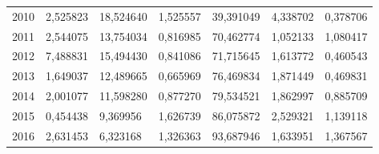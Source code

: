 \begin{table}
\begin{tabular}{p{1cm}p{2cm}p{2cm}p{2cm}p{2cm}p{2cm}p{2cm}}
 2010 &         2,525823 &                       18,524640 &                           1,525557 &                  39,391049 &                       4,338702 &    0,378706 \\
 2011 &         2,544075 &                       13,754034 &                           0,816985 &                  70,462774 &                       1,052133 &    1,080417 \\
 2012 &         7,488831 &                       15,494430 &                           0,841086 &                  71,715645 &                       1,613772 &    0,460543 \\
 2013 &         1,649037 &                       12,489665 &                           0,665969 &                  76,469834 &                       1,871449 &    0,469831 \\
 2014 &         2,001077 &                       11,598280 &                           0,877270 &                  79,534521 &                       1,862997 &    0,885709 \\
 2015 &         0,454438 &                        9,369956 &                           1,626739 &                  86,075872 &                       2,529321 &    1,139118 \\
 2016 &         2,631453 &                        6,323168 &                           1,326363 &                  93,687946 &                       1,633951 &    1,367567 \\
\bottomrule
\end{tabular}
\end{table}
